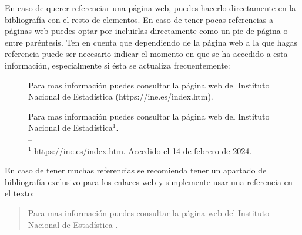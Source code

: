 En caso de querer referenciar una página web, puedes hacerlo directamente en la bibliografía con el resto de elementos. En caso de tener pocas referencias a páginas web puedes optar por incluirlas directamente como un pie de página o entre paréntesis. Ten en cuenta que dependiendo de la página web a la que hagas referencia puede ser necesario indicar el momento en que se ha accedido a esta información, especialmente si ésta se actualiza frecuentemente:

\begin{figure}[!ht]
    \begin{minipage}{.45\textwidth}
        \begin{it}
        Para mas información puedes consultar la página web del Instituto Nacional de Estadística (https://ine.es/index.htm).
        \end{it}
    \end{minipage}
    \hfill
    \begin{minipage}{.45\textwidth}
        \begin{it}
        Para mas información puedes consultar la página web del Instituto Nacional de Estadística$^1$.\\
        --\\
        $^1$ https://ine.es/index.htm. Accedido el 14 de febrero de 2024.
        \end{it}
    \end{minipage}
\end{figure}

En caso de tener muchas referencias se recomienda tener un apartado de bibliografía exclusivo para los enlaces web y simplemente usar una referencia en el texto:

\begin{quote}
\begin{it}
    Para mas información puedes consultar la página web del Instituto Nacional de Estadística \cite{INE}.
\end{it}
\end{quote}

